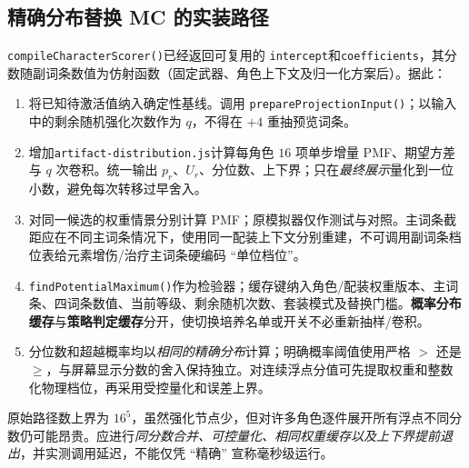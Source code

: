 \documentclass[11pt,a4paper]{ctexart}
\begin{document}
\subsection{精确分布替换 MC 的实装路径}
\texttt{compileCharacterScorer()}已经返回可复用的 \texttt{intercept}和\texttt{coefficients}，其分数随副词条数值为仿射函数（固定武器、角色上下文及归一化方案后）。据此：
\begin{enumerate}
\item 将已知待激活值纳入确定性基线。调用 \texttt{prepareProjectionInput()}；以输入中的剩余随机强化次数作为 $q$，不得在 $+4$ 重抽预览词条。
\item 增加\texttt{artifact-distribution.js}计算每角色 $16$ 项单步增量 PMF、期望方差与 $q$ 次卷积。统一输出 $p_r$、$U_r$、分位数、上下界；只在\emph{最终展示}量化到一位小数，避免每次转移过早舍入。
\item 对同一候选的权重情景分别计算 PMF；原模拟器仅作测试与对照。主词条截距应在不同主词条情况下，使用同一配装上下文分别重建，不可调用副词条档位表给元素增伤/治疗主词条硬编码 ``单位档位''。
\item \texttt{findPotentialMaximum()}作为检验器；缓存键纳入角色/配装权重版本、主词条、四词条数值、当前等级、剩余随机次数、套装模式及替换门槛。\textbf{概率分布缓存}与\textbf{策略判定缓存}分开，使切换培养名单或开关不必重新抽样/卷积。
\item 分位数和超越概率均以\emph{相同的精确分布}计算；明确概率阈值使用严格 $>$ 还是 $\ge$，与屏幕显示分数的舍入保持独立。对连续浮点分值可先提取权重和整数化物理档位，再采用受控量化和误差上界。
\end{enumerate}
原始路径数上界为 $16^5$，虽然强化节点少，但对许多角色逐件展开所有浮点不同分数仍可能昂贵。应进行\emph{同分数合并、可控量化、相同权重缓存以及上下界提前退出}，并实测调用延迟，不能仅凭 ``精确'' 宣称毫秒级运行。
\end{document}
